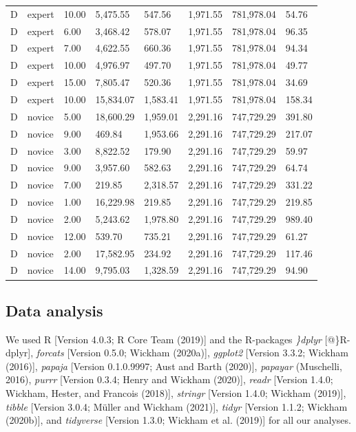 \documentclass[
  english,
  man,floatsintext]{apa6}
\begin{document}
\begin{table}[h]
\begin{center}
\begin{threeparttable}
{\begin{tabular}{llllllll}
D & expert & 10.00 & 5,475.55 & 547.56 & 1,971.55 & 781,978.04 & 54.76\\
D & expert & 6.00 & 3,468.42 & 578.07 & 1,971.55 & 781,978.04 & 96.35\\
D & expert & 7.00 & 4,622.55 & 660.36 & 1,971.55 & 781,978.04 & 94.34\\
D & expert & 10.00 & 4,976.97 & 497.70 & 1,971.55 & 781,978.04 & 49.77\\
D & expert & 15.00 & 7,805.47 & 520.36 & 1,971.55 & 781,978.04 & 34.69\\
D & expert & 10.00 & 15,834.07 & 1,583.41 & 1,971.55 & 781,978.04 & 158.34\\
D & novice & 5.00 & 18,600.29 & 1,959.01 & 2,291.16 & 747,729.29 & 391.80\\
D & novice & 9.00 & 469.84 & 1,953.66 & 2,291.16 & 747,729.29 & 217.07\\
D & novice & 3.00 & 8,822.52 & 179.90 & 2,291.16 & 747,729.29 & 59.97\\
D & novice & 9.00 & 3,957.60 & 582.63 & 2,291.16 & 747,729.29 & 64.74\\
D & novice & 7.00 & 219.85 & 2,318.57 & 2,291.16 & 747,729.29 & 331.22\\
D & novice & 1.00 & 16,229.98 & 219.85 & 2,291.16 & 747,729.29 & 219.85\\
D & novice & 2.00 & 5,243.62 & 1,978.80 & 2,291.16 & 747,729.29 & 989.40\\
D & novice & 12.00 & 539.70 & 735.21 & 2,291.16 & 747,729.29 & 61.27\\
D & novice & 2.00 & 17,582.95 & 234.92 & 2,291.16 & 747,729.29 & 117.46\\
D & novice & 14.00 & 9,795.03 & 1,328.59 & 2,291.16 & 747,729.29 & 94.90\\
\bottomrule
\end{tabular}

}

\end{threeparttable}
\end{center}

\end{table}

\hypertarget{data-analysis}{%
\subsection{Data analysis}\label{data-analysis}}

We used R {[}Version 4.0.3; R Core Team (2019){]} and the R-packages \emph{\}dplyr} {[}@\}R-dplyr{]}, \emph{forcats} {[}Version 0.5.0; Wickham (2020a){]}, \emph{ggplot2} {[}Version 3.3.2; Wickham (2016){]}, \emph{papaja} {[}Version 0.1.0.9997; Aust and Barth (2020){]}, \emph{papayar} (Muschelli, 2016), \emph{purrr} {[}Version 0.3.4; Henry and Wickham (2020){]}, \emph{readr} {[}Version 1.4.0; Wickham, Hester, and Francois (2018){]}, \emph{stringr} {[}Version 1.4.0; Wickham (2019){]}, \emph{tibble} {[}Version 3.0.4; Müller and Wickham (2021){]}, \emph{tidyr} {[}Version 1.1.2; Wickham (2020b){]}, and \emph{tidyverse} {[}Version 1.3.0; Wickham et al. (2019){]} for all our analyses.
\end{document}
